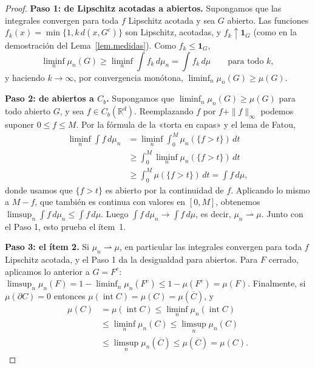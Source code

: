 \documentclass[12pt, a4paper]{amsbook}
\newcommand{\R}{{\mathbb R}}
\theoremstyle{remark}
\theoremstyle{definition}
\numberwithin{section}{chapter}
\numberwithin{subsection}{section}
\numberwithin{equation}{section}
\numberwithin{figure}{chapter}
\begin{document}
\begin{proof}
\textbf{Paso 1: de Lipschitz acotadas a abiertos.} Supongamos que las
integrales convergen para toda $f$ Lipschitz acotada y sea $G$ abierto. Las
funciones $f_k(x)=\min\{1,k\,d(x,G^c)\}$ son Lipschitz, acotadas, y
$f_k\uparrow\mathbf 1_G$ (como en la demostración del Lema~\ref{lem.medidas}).
Como $f_k\le\mathbf 1_G$,
\[
\liminf_n\mu_n(G)\ge\liminf_n\int f_k\,d\mu_n=\int f_k\,d\mu
\qquad\text{para todo }k,
\]
y haciendo $k\to\infty$, por convergencia monótona, $\liminf_n\mu_n(G)\ge\mu(G)$.

\medskip
\textbf{Paso 2: de abiertos a $C_b$.} Supongamos que
$\liminf_n\mu_n(G)\ge\mu(G)$ para todo abierto $G$, y sea $f\in C_b(\R^d)$.
Reemplazando $f$ por $f+\|f\|_\infty$ podemos suponer $0\le f\le M$. Por la
fórmula de la «torta en capas» y el lema de Fatou,
\[
\begin{aligned}
\liminf_n\int f\,d\mu_n
&=\liminf_n\int_0^M\mu_n(\{f>t\})\,dt\\
&\ge\int_0^M\liminf_n\mu_n(\{f>t\})\,dt\\
&\ge\int_0^M\mu(\{f>t\})\,dt=\int f\,d\mu,
\end{aligned}
\]
donde usamos que $\{f>t\}$ es abierto por la continuidad de $f$. Aplicando lo
mismo a $M-f$, que también es continua con valores en $[0,M]$, obtenemos
$\limsup_n\int f\,d\mu_n\le\int f\,d\mu$. Luego $\int f\,d\mu_n\to\int f\,d\mu$,
es decir, $\mu_n\rightharpoonup\mu$. Junto con el Paso 1, esto prueba el
ítem~1.

\medskip
\textbf{Paso 3: el ítem 2.} Si $\mu_n\rightharpoonup\mu$, en particular las
integrales convergen para toda $f$ Lipschitz acotada, y el Paso 1 da la
desigualdad para abiertos. Para $F$ cerrado, aplicamos lo anterior a $G=F^c$:
$\limsup_n\mu_n(F)=1-\liminf_n\mu_n(F^c)\le1-\mu(F^c)=\mu(F)$. Finalmente, si
$\mu(\partial C)=0$ entonces $\mu(\operatorname{int}C)=\mu(C)=\mu(\overline C)$,
y
\[
\begin{aligned}
\mu(C)&=\mu(\operatorname{int}C)\le\liminf_n\mu_n(\operatorname{int}C)\\
&\le\liminf_n\mu_n(C)\le\limsup_n\mu_n(C)\\
&\le\limsup_n\mu_n(\overline C)\le\mu(\overline C)=\mu(C).
\end{aligned}
\]
\end{proof}
\end{document}
